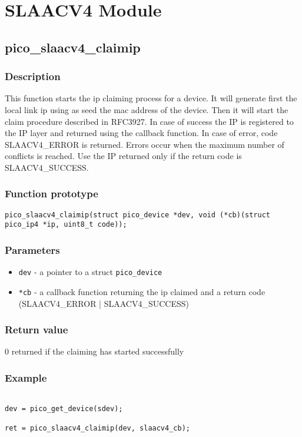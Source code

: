 \section{SLAACV4 Module}



\subsection{pico\_slaacv4\_claimip}

\subsubsection*{Description}
This function starts the ip claiming process for a device. It will generate first the local link ip using
as seed the mac address of the device. Then it will start the claim procedure described in RFC3927. 
In case of success the IP is registered to the IP layer and returned using the callback function. 
In case of error, code SLAACV4\_ERROR is returned. Errors occur when the maximum number of conflicts is reached. 
Use the IP returned only if the return code is SLAACV4\_SUCCESS.

\subsubsection*{Function prototype}
\texttt{pico\_slaacv4\_claimip(struct pico\_device *dev, void (*cb)(struct pico\_ip4 *ip,  uint8\_t code));}

\subsubsection*{Parameters}
\begin{itemize}[noitemsep]
\item \texttt{dev} - a pointer to a struct \texttt{pico\_device}
\item \texttt{*cb} - a callback function returning the ip claimed and a return code (SLAACV4\_ERROR | SLAACV4\_SUCCESS)
\end{itemize}

\subsubsection*{Return value}
0 returned if the claiming has started successfully

\subsubsection*{Example}
\begin{verbatim}

dev = pico_get_device(sdev);

ret = pico_slaacv4_claimip(dev, slaacv4_cb);

\end{verbatim}

